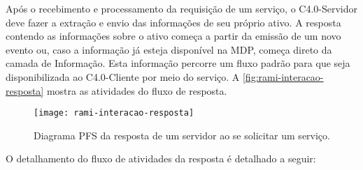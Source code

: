 Após o recebimento e processamento da requisição de um serviço, o C4.0-Servidor deve fazer a extração e envio das informações de seu próprio ativo. A resposta contendo as informações sobre o ativo começa a partir da emissão de um novo evento ou, caso a informação já esteja disponível na MDP, começa direto da camada de Informação. Esta informação percorre um fluxo padrão para que seja disponibilizada ao C4.0-Cliente por meio do serviço. A \autoref{fig:rami-interacao-resposta} mostra as atividades do fluxo de resposta.

\begin{figure}[htb]
	\centering
	\texttt{[image: rami-interacao-resposta]}
	\caption{Diagrama PFS da resposta de um servidor ao se solicitar um serviço.}
	\label{fig:rami-interacao-resposta}
\end{figure}

O detalhamento do fluxo de atividades da resposta é detalhado a seguir:

